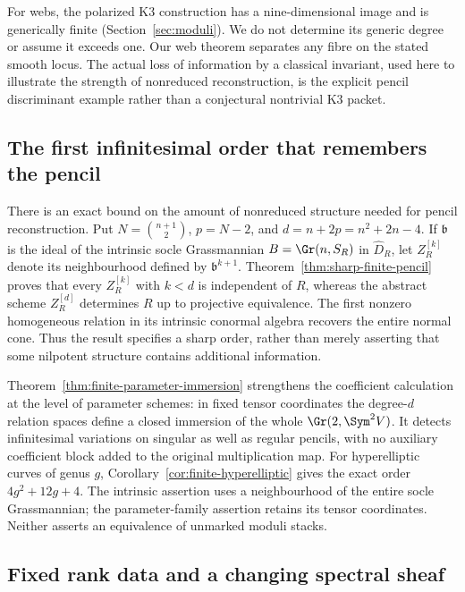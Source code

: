 For webs, the polarized K3 construction has a nine-dimensional image
and is generically finite (Section~\ref{sec:moduli}).  We do not
determine its generic degree or assume it exceeds one.  Our web
theorem separates any fibre on the stated smooth locus.  The actual
loss of information by a classical invariant, used here to illustrate
the strength of nonreduced reconstruction, is the explicit pencil
discriminant example rather than a conjectural nontrivial K3 packet.


\subsection{The first infinitesimal order that remembers the pencil}

There is an exact bound on the amount of nonreduced structure needed
for pencil reconstruction.  Put \(N=\binom{n+1}{2}\),
\(p=N-2\), and \(d=n+2p=n^2+2n-4\).  If
\(\mathfrak b\) is the ideal of the intrinsic socle Grassmannian
\(B=\Gr(n,S_R)\) in \(\widehat D_R\), let
\(Z_R^{[k]}\) denote its neighbourhood defined by
\(\mathfrak b^{k+1}\).  Theorem~\ref{thm:sharp-finite-pencil}
proves that every \(Z_R^{[k]}\) with \(k<d\) is independent
of \(R\), whereas the abstract scheme \(Z_R^{[d]}\)
determines \(R\) up to projective equivalence.  The first
nonzero homogeneous relation in its intrinsic conormal algebra
recovers the entire normal cone.  Thus the result specifies a sharp
order, rather than merely asserting that some nilpotent structure
contains additional information.

Theorem~\ref{thm:finite-parameter-immersion} strengthens the
coefficient calculation at the level of parameter schemes: in fixed
tensor coordinates the degree-\(d\) relation spaces define a
closed immersion of the whole \(\Gr(2,\Sym^2V)\).
It detects infinitesimal variations on singular as well as regular
pencils, with no auxiliary coefficient block added to the original
multiplication map.  For hyperelliptic curves of genus \(g\),
Corollary~\ref{cor:finite-hyperelliptic} gives the exact order
\(4g^2+12g+4\).  The intrinsic assertion uses a neighbourhood
of the entire socle Grassmannian; the parameter-family assertion
retains its tensor coordinates.  Neither asserts an equivalence
of unmarked moduli stacks.

\subsection{Fixed rank data and a changing spectral sheaf}

